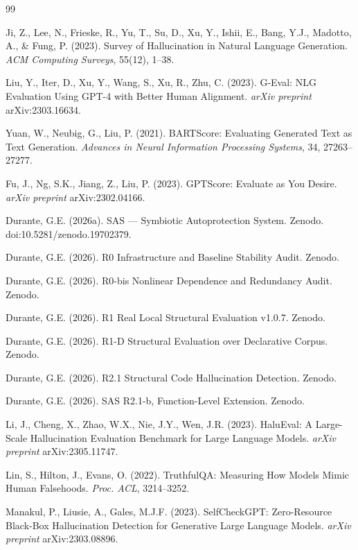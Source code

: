 \documentclass[11pt,a4paper]{article}
\begin{document}

\begin{thebibliography}{99}

Ji, Z., Lee, N., Frieske, R., Yu, T., Su, D., Xu, Y., Ishii, E., Bang, Y.J., Madotto, A., \& Fung, P. (2023). Survey of Hallucination in Natural Language Generation. \textit{ACM Computing Surveys}, 55(12), 1--38.

Liu, Y., Iter, D., Xu, Y., Wang, S., Xu, R., Zhu, C. (2023). G-Eval: NLG Evaluation Using GPT-4 with Better Human Alignment. \textit{arXiv preprint} arXiv:2303.16634.

Yuan, W., Neubig, G., Liu, P. (2021). BARTScore: Evaluating Generated Text as Text Generation. \textit{Advances in Neural Information Processing Systems}, 34, 27263--27277.

Fu, J., Ng, S.K., Jiang, Z., Liu, P. (2023). GPTScore: Evaluate as You Desire. \textit{arXiv preprint} arXiv:2302.04166.

Durante, G.E. (2026a). SAS --- Symbiotic Autoprotection System. Zenodo. doi:10.5281/zenodo.19702379.

Durante, G.E. (2026). R0 Infrastructure and Baseline Stability Audit. Zenodo.

Durante, G.E. (2026). R0-bis Nonlinear Dependence and Redundancy Audit. Zenodo.

Durante, G.E. (2026). R1 Real Local Structural Evaluation v1.0.7. Zenodo.

Durante, G.E. (2026). R1-D Structural Evaluation over Declarative Corpus. Zenodo.

Durante, G.E. (2026). R2.1 Structural Code Hallucination Detection. Zenodo.

Durante, G.E. (2026). SAS R2.1-b, Function-Level Extension. Zenodo.

Li, J., Cheng, X., Zhao, W.X., Nie, J.Y., Wen, J.R. (2023). HaluEval: A Large-Scale Hallucination Evaluation Benchmark for Large Language Models. \textit{arXiv preprint} arXiv:2305.11747.

Lin, S., Hilton, J., Evans, O. (2022). TruthfulQA: Measuring How Models Mimic Human Falsehoods. \textit{Proc. ACL}, 3214--3252.

Manakul, P., Liusie, A., Gales, M.J.F. (2023). SelfCheckGPT: Zero-Resource Black-Box Hallucination Detection for Generative Large Language Models. \textit{arXiv preprint} arXiv:2303.08896.

\end{thebibliography}
\end{document}
